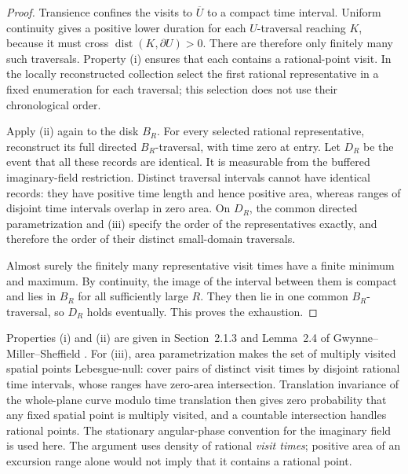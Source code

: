 \begin{proof}
Transience confines the visits to $\overline U$ to a compact
time interval.  Uniform continuity gives a positive lower
duration for each $U$-traversal reaching $K$, because it must
cross $\operatorname{dist}(K,\partial U)>0$.  There are
therefore only finitely many such traversals.  Property (i)
ensures that each contains a rational-point visit.  In the
locally reconstructed collection select the first rational
representative in a fixed enumeration for each traversal;
this selection does not use their chronological order.

Apply (ii) again to the disk $B_R$.  For every selected rational
representative, reconstruct its full directed $B_R$-traversal,
with time zero at entry.  Let $D_R$ be the event that all these
records are identical.  It is measurable from the buffered
imaginary-field restriction.  Distinct traversal intervals cannot
have identical records: they have positive time length and hence
positive area, whereas ranges of disjoint time intervals overlap
in zero area.  On $D_R$, the common directed parametrization and
(iii) specify the order of the representatives exactly, and therefore
the order of their distinct small-domain traversals.

Almost surely the finitely many representative visit times have a
finite minimum and maximum.  By continuity, the image of the
interval between them is compact and lies in $B_R$ for all
sufficiently large $R$.  They then lie in one common $B_R$-traversal,
so $D_R$ holds eventually.  This proves the exhaustion.
\end{proof}

\begin{remark}
Properties (i) and (ii) are given in Section~2.1.3 and
Lemma~2.4 of Gwynne--Miller--Sheffield
\cite{GwynneMillerSheffieldHarmonic}.
For (iii), area parametrization makes the set of multiply visited
spatial points Lebesgue-null: cover pairs of distinct visit times
by disjoint rational time intervals, whose ranges have zero-area
intersection.  Translation invariance of the whole-plane curve
modulo time translation then gives zero probability that any fixed
spatial point is multiply visited, and a countable intersection
handles rational points.  The stationary angular-phase convention
for the imaginary field is used here.
The argument uses density of rational \emph{visit times};
positive area of an excursion range alone would not imply
that it contains a rational point.
\end{remark}

